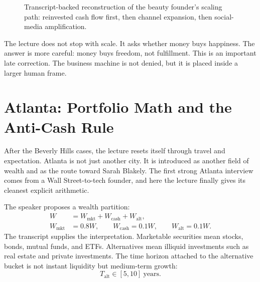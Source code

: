 \begin{figure}[h]
\centering
{}
\caption{Transcript-backed reconstruction of the beauty founder's scaling path: reinvested cash flow first, then channel expansion, then social-media amplification.}
\end{figure}

The lecture does not stop with scale. It asks whether money buys happiness. The answer is more careful: money buys freedom, not fulfillment. This is an important late correction. The business machine is not denied, but it is placed inside a larger human frame.

\section{Atlanta: Portfolio Math and the Anti-Cash Rule}

After the Beverly Hills cases, the lecture resets itself through travel and expectation. Atlanta is not just another city. It is introduced as another field of wealth and as the route toward Sarah Blakely. The first strong Atlanta interview comes from a Wall Street-to-tech founder, and here the lecture finally gives its cleanest explicit arithmetic.

The speaker proposes a wealth partition:
\begin{align}
W &= W_{\mathrm{mkt}} + W_{\mathrm{cash}} + W_{\mathrm{alt}}, \\
W_{\mathrm{mkt}} &= 0.8W, \qquad
W_{\mathrm{cash}} = 0.1W, \qquad
W_{\mathrm{alt}} = 0.1W.
\end{align}
The transcript supplies the interpretation. Marketable securities mean stocks, bonds, mutual funds, and ETFs. Alternatives mean illiquid investments such as real estate and private investments. The time horizon attached to the alternative bucket is not instant liquidity but medium-term growth:
\begin{equation}
T_{\mathrm{alt}} \in [5,10]\ \text{years}.
\end{equation}

